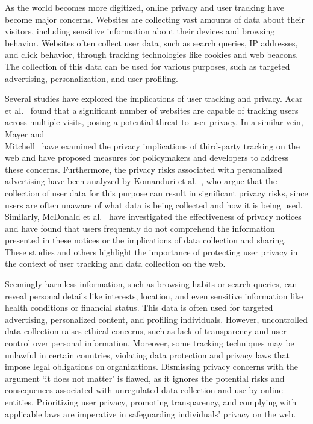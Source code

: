 
As the world becomes more digitized, online privacy and user tracking have become major concerns. Websites are collecting vast amounts of data about their visitors, including sensitive information about their devices and browsing behavior. Websites often collect user data, such as search queries, IP addresses, and click behavior, through tracking technologies like cookies and web beacons. The collection of this data can be used for various purposes, such as targeted advertising, personalization, and user profiling.
 
Several studies have explored the implications of user tracking and privacy. Acar et al.~ found that a significant number of websites are capable of tracking users across multiple visits, posing a potential threat to user privacy. In a similar vein, Mayer and \\ Mitchell~ have examined the privacy implications of third-party tracking on the web and have proposed measures for policymakers and developers to address these concerns.
Furthermore, the privacy risks associated with personalized advertising have been analyzed by Komanduri et al.~, who argue that the collection of user data for this purpose can result in significant privacy risks, since users are often unaware of what data is being collected and how it is being used. Similarly, McDonald et al.~ have investigated the effectiveness of privacy notices and have found that users frequently do not comprehend the information presented in these notices or the implications of data collection and sharing. These studies and others highlight the importance of protecting user privacy in the context of user tracking and data collection on the web.

Seemingly harmless information, such as browsing habits or search queries, can reveal personal details like interests, location, and even sensitive information like health conditions or financial status. This data is often used for targeted advertising, personalized content, and profiling individuals. However, uncontrolled data collection raises ethical concerns, such as lack of transparency and user control over personal information. Moreover, some tracking techniques may be unlawful in certain countries, violating data protection and privacy laws that impose legal obligations on organizations. Dismissing privacy concerns with the argument `it does not matter' is flawed, as it ignores the potential risks and consequences associated with unregulated data collection and use by online entities. Prioritizing user privacy, promoting transparency, and complying with applicable laws are imperative in safeguarding individuals' privacy on the web.

